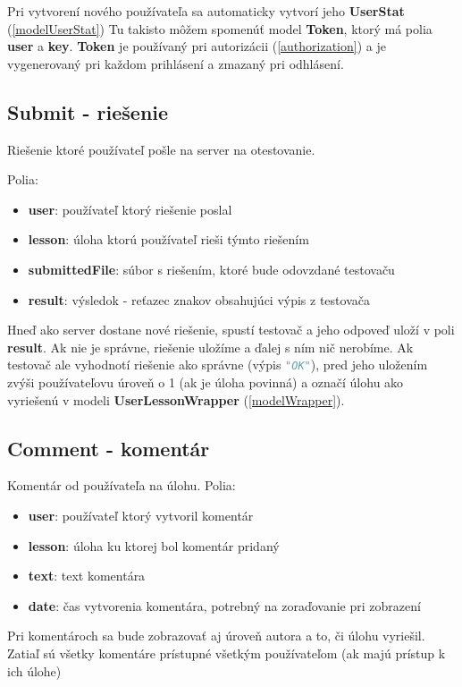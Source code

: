 Pri vytvorení nového používateľa sa automaticky vytvorí jeho \textbf{UserStat} (\ref{modelUserStat})
\newline
Tu takisto môžem spomenúť model \textbf{Token}, ktorý má polia \textbf{user} a \textbf{key}.
\textbf{Token} je používaný pri autorizácii (\ref{authorization}) a je vygenerovaný
pri každom prihlásení a zmazaný pri odhlásení.
\newpage
\subsection{Submit - riešenie}
Riešenie ktoré používateľ pošle na server na otestovanie.

Polia:
\begin{itemize}
\item \textbf{user}: používateľ ktorý riešenie poslal
\item \textbf{lesson}: úloha ktorú používateľ rieši týmto riešením
\item \textbf{submittedFile}: súbor s riešením, ktoré bude odovzdané testovaču
\item \textbf{result}: výsledok - reťazec znakov obsahujúci výpis z testovača
\end{itemize}

Hneď ako server dostane nové riešenie, spustí testovač a jeho odpoveď uloží v poli
\textbf{result}. Ak nie je správne, riešenie uložíme a ďalej s ním nič nerobíme.
Ak testovač ale vyhodnotí riešenie ako správne (výpis \lstinline[language=Python]{"OK"}), pred jeho uložením zvýši používateľovu
úroveň o 1 (ak je úloha povinná) a označí úlohu ako vyriešenú v modeli \textbf{UserLessonWrapper} (\ref{modelWrapper}).

\subsection{Comment - komentár}
Komentár od používateľa na úlohu.
Polia:
\begin{itemize}
\item \textbf{user}: používateľ ktorý vytvoril komentár
\item \textbf{lesson}: úloha ku ktorej bol komentár pridaný
\item \textbf{text}: text komentára
\item \textbf{date}: čas vytvorenia komentára, potrebný na zoraďovanie pri zobrazení
\end{itemize}

Pri komentároch sa bude zobrazovať aj úroveň autora a to, či úlohu vyriešil.
Zatiaľ sú všetky komentáre prístupné všetkým používateľom (ak majú prístup k ich úlohe)


